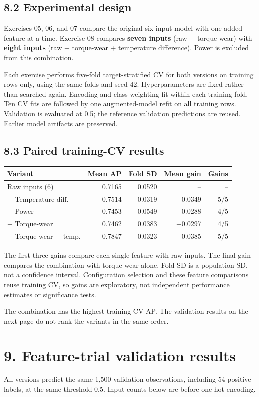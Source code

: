 \documentclass[11pt,a4paper]{article}
\newcommand{\pagetitle}[1]{\section*{#1}}
\begin{document}
\subsection*{8.2 Experimental design}
Exercises 05, 06, and 07 compare the original six-input model with one added
feature at a time. Exercise 08 compares \textbf{seven inputs} (raw + torque-wear)
with \textbf{eight inputs} (raw + torque-wear + temperature difference).
Power is excluded from this combination.

Each exercise performs five-fold target-stratified CV for both versions on
training rows only, using the same folds and seed 42. Hyperparameters are
fixed rather than searched again. Encoding and class weighting fit within
each training fold. Ten CV fits are followed by one augmented-model refit on
all training rows. Validation is evaluated at 0.5; the reference validation
predictions are reused. Earlier model artifacts are preserved.

\subsection*{8.3 Paired training-CV results}
\begin{center}
{\small
\begin{tabular}{lrrrr}
\toprule
Variant & Mean AP & Fold SD & Mean gain & Gains \\
\midrule
Raw inputs (6) & 0.7165 & 0.0520 & -- & -- \\
+ Temperature diff. & 0.7514 & 0.0319 & +0.0349 & 5/5 \\
+ Power & 0.7453 & 0.0549 & +0.0288 & 4/5 \\
+ Torque-wear & 0.7462 & 0.0383 & +0.0297 & 4/5 \\
+ Torque-wear + temp. & 0.7847 & 0.0323 & +0.0385 & 5/5 \\
\bottomrule
\end{tabular}}
\end{center}
The first three gains compare each single feature with raw inputs. The final
gain compares the combination with torque-wear alone. Fold SD is a population
SD, not a confidence interval. Configuration selection and these feature
comparisons reuse training CV, so gains are exploratory, not independent
performance estimates or significance tests.

The combination has the highest training-CV AP. The validation results on
the next page do not rank the variants in the same order.

\newpage
\pagetitle{9. Feature-trial validation results}
All versions predict the same 1,500 validation observations, including 54
positive labels, at the same threshold 0.5. Input counts below are before
one-hot encoding.
\end{document}
